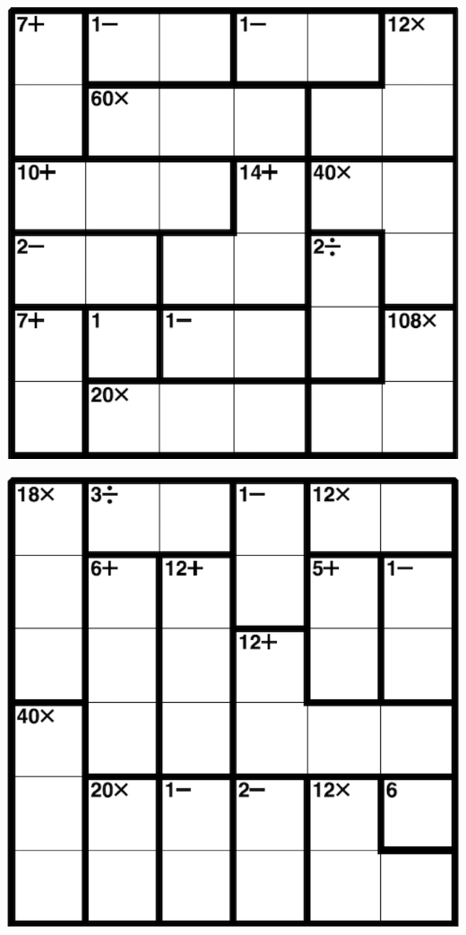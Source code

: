 
\includegraphics[scale=1]{Gambar/Lampiran/6x6_35.png}

\includegraphics[scale=1]{Gambar/Lampiran/6x6_36.png}
